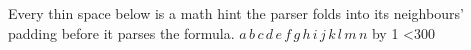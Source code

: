 \documentclass{article}
\begin{document}
Every thin space below is a math hint the parser folds into its neighbours'
padding before it parses the formula.
\newcount\formulas {}
\loop
$a\,b\,c\,d\,e\,f\,g\,h\,i\,j\,k\,l\,m\,n$
\advance\formulas by 1
\ifnum\formulas<300 \repeat
\end{document}
